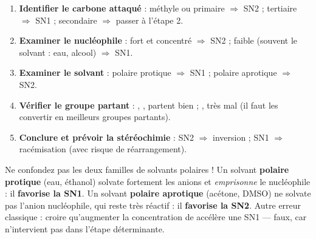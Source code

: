\documentclass[11pt]{article}
\begin{document}
\begin{methode}
\begin{enumerate}
\item \textbf{Identifier le carbone attaqué} : méthyle ou primaire $\Rightarrow$ SN2 ; tertiaire $\Rightarrow$ SN1 ; secondaire $\Rightarrow$ passer à l'étape 2.
\item \textbf{Examiner le nucléophile} : fort et concentré $\Rightarrow$ SN2 ; faible (souvent le solvant : eau, alcool) $\Rightarrow$ SN1.
\item \textbf{Examiner le solvant} : polaire protique $\Rightarrow$ SN1 ; polaire aprotique $\Rightarrow$ SN2.
\item \textbf{Vérifier le groupe partant} : , ,  partent bien ; ,  très mal (il faut les convertir en meilleurs groupes partants).
\item \textbf{Conclure et prévoir la stéréochimie} : SN2 $\Rightarrow$ inversion ; SN1 $\Rightarrow$ racémisation (avec risque de réarrangement).
\end{enumerate}
\end{methode}

\begin{attention}
Ne confondez pas les deux familles de solvants polaires ! Un solvant \textbf{polaire protique} (eau, éthanol) solvate fortement les anions et \emph{emprisonne} le nucléophile : il \textbf{favorise la SN1}. Un solvant \textbf{polaire aprotique} (acétone, DMSO) ne solvate pas l'anion nucléophile, qui reste très réactif : il \textbf{favorise la SN2}. Autre erreur classique : croire qu'augmenter la concentration de  accélère une SN1 — faux, car  n'intervient pas dans l'étape déterminante.
\end{attention}
\end{document}
